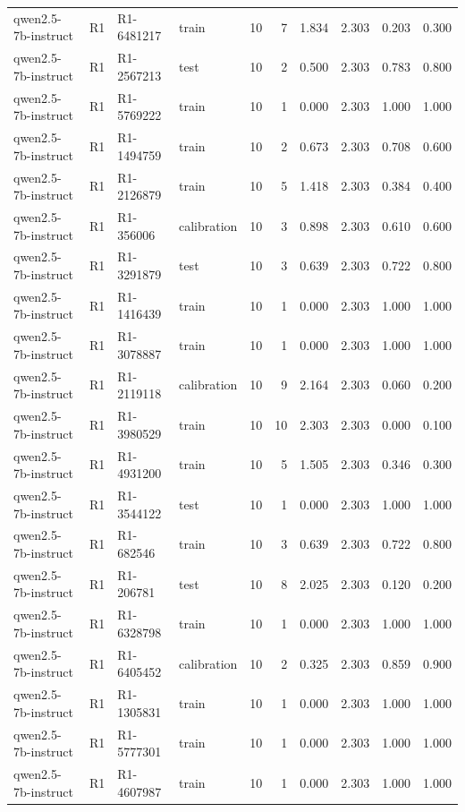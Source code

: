\begin{table}
\begin{tabular}{llllrrrrrr}
qwen2.5-7b-instruct & R1 & R1-6481217 & train & 10 & 7 & 1.834 & 2.303 & 0.203 & 0.300 \\
qwen2.5-7b-instruct & R1 & R1-2567213 & test & 10 & 2 & 0.500 & 2.303 & 0.783 & 0.800 \\
qwen2.5-7b-instruct & R1 & R1-5769222 & train & 10 & 1 & 0.000 & 2.303 & 1.000 & 1.000 \\
qwen2.5-7b-instruct & R1 & R1-1494759 & train & 10 & 2 & 0.673 & 2.303 & 0.708 & 0.600 \\
qwen2.5-7b-instruct & R1 & R1-2126879 & train & 10 & 5 & 1.418 & 2.303 & 0.384 & 0.400 \\
qwen2.5-7b-instruct & R1 & R1-356006 & calibration & 10 & 3 & 0.898 & 2.303 & 0.610 & 0.600 \\
qwen2.5-7b-instruct & R1 & R1-3291879 & test & 10 & 3 & 0.639 & 2.303 & 0.722 & 0.800 \\
qwen2.5-7b-instruct & R1 & R1-1416439 & train & 10 & 1 & 0.000 & 2.303 & 1.000 & 1.000 \\
qwen2.5-7b-instruct & R1 & R1-3078887 & train & 10 & 1 & 0.000 & 2.303 & 1.000 & 1.000 \\
qwen2.5-7b-instruct & R1 & R1-2119118 & calibration & 10 & 9 & 2.164 & 2.303 & 0.060 & 0.200 \\
qwen2.5-7b-instruct & R1 & R1-3980529 & train & 10 & 10 & 2.303 & 2.303 & 0.000 & 0.100 \\
qwen2.5-7b-instruct & R1 & R1-4931200 & train & 10 & 5 & 1.505 & 2.303 & 0.346 & 0.300 \\
qwen2.5-7b-instruct & R1 & R1-3544122 & test & 10 & 1 & 0.000 & 2.303 & 1.000 & 1.000 \\
qwen2.5-7b-instruct & R1 & R1-682546 & train & 10 & 3 & 0.639 & 2.303 & 0.722 & 0.800 \\
qwen2.5-7b-instruct & R1 & R1-206781 & test & 10 & 8 & 2.025 & 2.303 & 0.120 & 0.200 \\
qwen2.5-7b-instruct & R1 & R1-6328798 & train & 10 & 1 & 0.000 & 2.303 & 1.000 & 1.000 \\
qwen2.5-7b-instruct & R1 & R1-6405452 & calibration & 10 & 2 & 0.325 & 2.303 & 0.859 & 0.900 \\
qwen2.5-7b-instruct & R1 & R1-1305831 & train & 10 & 1 & 0.000 & 2.303 & 1.000 & 1.000 \\
qwen2.5-7b-instruct & R1 & R1-5777301 & train & 10 & 1 & 0.000 & 2.303 & 1.000 & 1.000 \\
qwen2.5-7b-instruct & R1 & R1-4607987 & train & 10 & 1 & 0.000 & 2.303 & 1.000 & 1.000 \\

\end{tabular}
\end{table}
